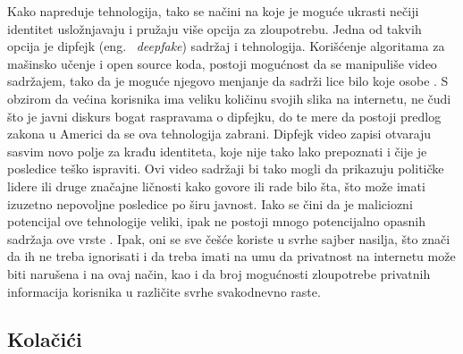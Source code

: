 \documentclass[a4paper]{article}
\begin{document}
\par Kako napreduje tehnologija, tako se načini na koje je moguće ukrasti nečiji identitet usložnjavaju i pružaju više opcija za zloupotrebu. Jedna od takvih opcija je dipfejk (eng. ~{\em deepfake}) sadržaj i tehnologija. Korišćenje algoritama za mašinsko učenje i open source koda, postoji mogućnost da se manipuliše video sadržajem, tako da je moguće njegovo menjanje da sadrži lice bilo koje osobe \cite{it3}.  S obzirom da većina korisnika ima veliku količinu svojih slika na internetu, ne čudi što je javni diskurs bogat raspravama o dipfejku, do te mere da postoji predlog zakona u Americi da se ova tehnologija zabrani. Dipfejk video zapisi otvaraju sasvim novo polje za krađu identiteta, koje nije tako lako prepoznati i čije je posledice teško ispraviti. Ovi video sadržaji bi tako mogli da prikazuju političke lidere ili druge značajne ličnosti kako govore ili rade bilo šta, što može imati izuzetno nepovoljne posledice po širu javnost. Iako se čini da je maliciozni potencijal ove tehnologije veliki, ipak ne postoji mnogo potencijalno opasnih sadržaja ove vrste \cite{it4}. Ipak, oni se sve češće koriste u svrhe sajber nasilja, što znači da ih ne treba ignorisati i da treba imati na umu da privatnost na internetu može biti narušena i na ovaj način, kao i da broj mogućnosti zloupotrebe privatnih informacija korisnika u različite svrhe svakodnevno raste.  

\subsection{Kolačići}
\end{document}
